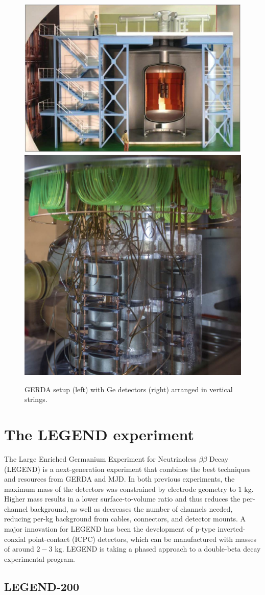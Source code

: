 \begin{figure}
\centering
\includegraphics[height=0.385\columnwidth]{ch2/figs/gerda_setup.pdf}
\qquad
\includegraphics[height=0.385\columnwidth]{ch2/figs/gerdastrings.pdf}
\caption{GERDA setup (left) with Ge detectors (right) arranged in vertical strings.}
\label{fig:gerda}
\end{figure}
  
\section{The LEGEND experiment}
The Large Enriched Germanium Experiment for Neutrinoless $\beta\beta$ Decay (LEGEND) is a next-generation experiment that combines the best techniques and resources from GERDA and MJD. In both previous experiments, the maximum mass of the detectors was constrained by electrode geometry to $1$ kg. Higher mass results in a lower surface-to-volume ratio and thus reduces the per-channel background, as well as decreases the number of channels needed, reducing per-kg background from cables, connectors, and detector mounts. A major innovation for LEGEND has been the development of p-type inverted-coaxial point-contact (ICPC) detectors, which can be manufactured with masses of around $2-3$ kg. LEGEND is taking a phased approach to a double-beta decay experimental program.

\subsection{LEGEND-200}


